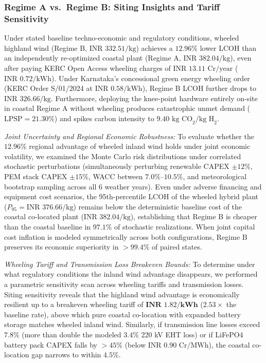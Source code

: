 \documentclass[conference]{IEEEtran}
\begin{document}
\subsubsection{Regime A vs.\ Regime B: Siting Insights and Tariff Sensitivity}
Under stated baseline techno-economic and regulatory conditions, wheeled highland wind (Regime B, $\text{INR } 332.51/\text{kg}$) achieves a $12.96\%$ lower LCOH than an independently re-optimized coastal plant (Regime A, $\text{INR } 382.04/\text{kg}$), even after paying KERC Open Access wheeling charges of $\text{INR } 13.11\text{ Cr/year}$ ($\text{INR } 0.72/\text{kWh}$). Under Karnataka's concessional green energy wheeling order (KERC Order S/01/2024 at $\text{INR } 0.58/\text{kWh}$), Regime B LCOH further drops to $\text{INR } 326.66/\text{kg}$. Furthermore, deploying the knee-point hardware entirely on-site in coastal Regime A without wheeling produces catastrophic unmet demand ($\text{LPSP} = 21.30\%$) and spikes carbon intensity to $9.40\text{ kg CO}_2/\text{kg H}_2$.

\textit{Joint Uncertainty and Regional Economic Robustness:} To evaluate whether the $12.96\%$ regional advantage of wheeled inland wind holds under joint economic volatility, we examined the Monte Carlo risk distributions under correlated stochastic perturbations (simultaneously perturbing renewable CAPEX $\pm 12\%$, PEM stack CAPEX $\pm 15\%$, WACC between $7.0\%\text{--}10.5\%$, and meteorological bootstrap sampling across all 6 weather years). Even under adverse financing and equipment cost scenarios, the 95th-percentile LCOH of the wheeled hybrid plant ($P_{95} = \text{INR } 376.66/\text{kg}$) remains below the deterministic baseline cost of the coastal co-located plant ($\text{INR } 382.04/\text{kg}$), establishing that Regime B is cheaper than the coastal baseline in $\mathbf{97.1\%}$ of stochastic realizations. When joint capital cost inflation is modeled symmetrically across both configurations, Regime B preserves its economic superiority in $>99.4\%$ of paired states.

\textit{Wheeling Tariff and Transmission Loss Breakeven Bounds:} To determine under what regulatory conditions the inland wind advantage disappears, we performed a parametric sensitivity scan across wheeling tariffs and transmission losses. Siting sensitivity reveals that the highland wind advantage is economically resilient up to a breakeven wheeling tariff of $\mathbf{\text{INR } 1.82/\text{kWh}}$ ($2.53\times$ the baseline rate), above which pure coastal co-location with expanded battery storage matches wheeled inland wind. Similarly, if transmission line losses exceed $7.8\%$ (more than double the modeled $3.4\%$ 220 kV EHT loss) or if LiFePO4 battery pack CAPEX falls by $>45\%$ (below $\text{INR } 0.90\text{ Cr/MWh}$), the coastal co-location gap narrows to within $4.5\%$.
\end{document}
